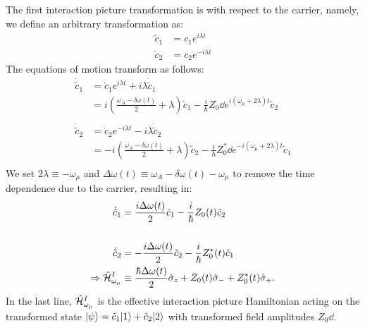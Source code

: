 The first interaction picture transformation is with respect to the carrier, namely, we define an arbitrary transformation as:
\begin{align}
\tilde{c}_1 &= c_1e^{i\lambda t} \\
\tilde{c}_2 &= c_2e^{-i\lambda t}
\end{align}
The equations of motion transform as follows:
\begin{align}
\dot{\tilde{c}}_1 & = \dot{c}_1 e^{i \lambda t} + i \lambda \dot{\tilde{c}}_1 \\
& =  i(\frac{\omega_A - \delta\omega(t)}{2} + \lambda)\tilde{c}_1 - \frac{i}{\hbar}Z_0\dd e^{i(\omega_\mu +2\lambda)t}\tilde{c}_2\\
& \nonumber \\
\dot{\tilde{c}}_2 & = \dot{c}_2 e^{-i \lambda t} - i \lambda \dot{\tilde{c}}_2 \\
& =  -i(\frac{\omega_A - \delta\omega(t)}{2} + \lambda)\tilde{c}_2- \frac{i}{\hbar}Z_0^*\dd e^{-i(\omega_\mu +2\lambda)t}\tilde{c}_1 \\
\end{align}
We set $2\lambda \equiv -\omega_\mu$ and $\Delta \omega(t) \equiv \omega_A - \delta\omega(t) -\omega_\mu$ to remove the time dependence due to the carrier, resulting in:
\begin{align}
\dot{\tilde{c}}_1 & =  \frac{i\Delta \omega(t)}{2}\tilde{c}_1 - \frac{i}{\hbar}Z_0(t) \tilde{c}_2\\
& \nonumber \\
\dot{\tilde{c}}_2 & =  -\frac{i\Delta \omega(t) }{2}\tilde{c}_2- \frac{i}{\hbar}Z_0^*(t) \tilde{c}_1\\
 \Rightarrow \hat{\mathcal{H}}_{\omega_\mu}^{I} &\equiv \frac{\hbar \Delta \omega(t)}{2}\hat{\sigma}_{z} + Z_0(t)\hat{\sigma}_{-} + Z_0^*(t)\hat{\sigma}_{+}.
\end{align}
In the last line, $\hat{\mathcal{H}}_{\omega_\mu}^{I}$ is the effective interaction picture Hamiltonian acting on the transformed state $| \psi \rangle = \tilde{c}_1| 1 \rangle + \tilde{c}_2| 2 \rangle$ with transformed field amplitudes $Z_0\dd$.

